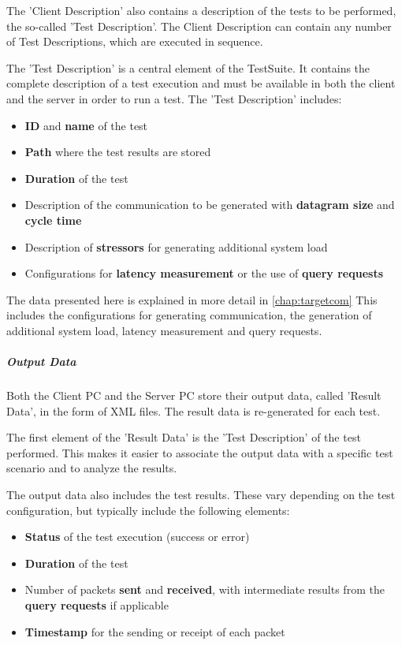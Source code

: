 The 'Client Description' also contains a description of the tests to be performed, the so-called 'Test Description'. The Client Description can contain any number of Test Descriptions, which are executed in sequence.

The 'Test Description' is a central element of the TestSuite. It contains the complete description of a test execution and must be available in both the client and the server in order to run a test. The 'Test Description' includes:
\begin{itemize}
	\item \textbf{ID} and \textbf{name} of the test
	\item \textbf{Path} where the test results are stored
	\item \textbf{Duration} of the test
	\item Description of the communication to be generated with \textbf{datagram size} and \textbf{cycle time}
	\item Description of \textbf{stressors} for generating additional system load
	\item Configurations for \textbf{latency measurement} or the use of \textbf{query requests}
\end{itemize}

The data presented here is explained in more detail in \ref{chap:targetcom} This includes the configurations for generating communication, the generation of additional system load, latency measurement and query requests.

\subparagraph{Output Data}

Both the Client PC and the Server PC store their output data, called 'Result Data', in the form of XML files. The result data is re-generated for each test.

The first element of the 'Result Data' is the 'Test Description' of the test performed. This makes it easier to associate the output data with a specific test scenario and to analyze the results.

The output data also includes the test results. These vary depending on the test configuration, but typically include the following elements:
\begin{itemize}
	\item \textbf{Status} of the test execution (success or error)
	\item \textbf{Duration} of the test
	\item Number of packets \textbf{sent} and \textbf{received}, with intermediate results from the \textbf{query requests} if applicable
	\item \textbf{Timestamp} for the sending or receipt of each packet
\end{itemize}

